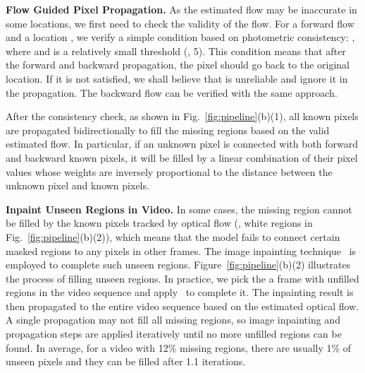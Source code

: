 \documentclass[10pt,twocolumn,letterpaper]{article}
\begin{document}
\noindent
\textbf{Flow Guided Pixel Propagation.}
As the estimated flow may be inaccurate in some locations, we first need to check the validity of the flow.
For a forward flow  and a location , we verify a simple condition based on photometric consistency: ,
where  and  is a relatively small threshold (\ie, 5).
This condition means that after the forward and backward propagation, the pixel should go back to the original location.
If it is not satisfied, we shall believe that  is unreliable and ignore it in the propagation.
The backward flow can be verified with the same approach.

After the consistency check, as shown in Fig.~\ref{fig:pipeline}(b)(1), all known pixels are propagated bidirectionally to fill the missing regions based on the valid estimated flow.
In particular, if an unknown pixel is connected with both forward and backward known pixels, it will be filled by a linear combination of their pixel values whose weights are inversely proportional to the distance between the unknown pixel and known pixels.




\noindent
\textbf{Inpaint Unseen Regions in Video.}
In some cases, the missing region cannot be filled by the known pixels tracked by optical flow (\eg, white regions in Fig.~\ref{fig:pipeline}(b)(2)), which means that the model fails to connect certain masked regions to any pixels in other frames.
The image inpainting technique~\cite{yu2018generative} is employed to complete such unseen regions.
Figure~\ref{fig:pipeline}(b)(2) illustrates the process of filling unseen regions.
In practice, we pick the a frame with unfilled regions in the video sequence and apply~\cite{yu2018generative} to complete it.
The inpainting result is then propagated to the entire video sequence based on the estimated optical flow.
A single propagation may not fill all missing regions, so image inpainting and propagation steps are applied iteratively until no more unfilled regions can be found.
In average, for a video with 12\% missing regions, there are usually 1\% of unseen pixels and they can be filled after 1.1 iterations.

 
\end{document}
